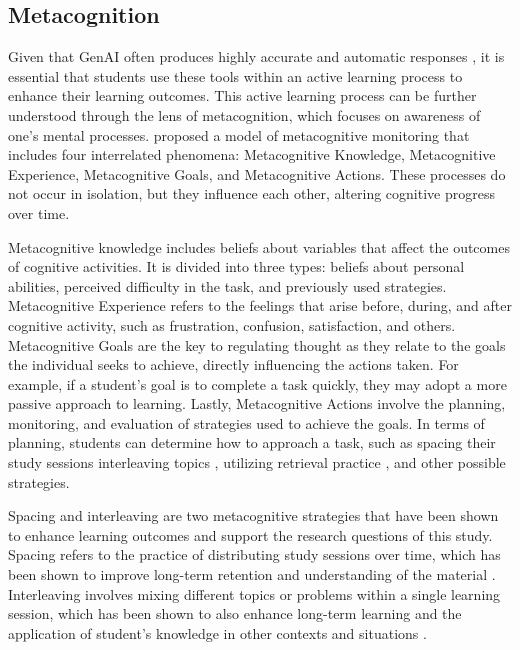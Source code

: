 \documentclass[runningheads]{llncs}
\begin{document}
\subsection{Metacognition}

Given that GenAI often produces highly accurate and automatic responses
\cite{Puryear22}, it is essential that students use these tools within an
active learning process to enhance their learning outcomes. This active
learning process can be further understood through the lens of metacognition,
which focuses on awareness of one's mental processes. \cite{flavell79}
proposed a model of metacognitive monitoring that includes four interrelated
phenomena: Metacognitive Knowledge, Metacognitive Experience, Metacognitive
Goals, and Metacognitive Actions. These processes do not occur in isolation, but
they influence each other, altering cognitive progress over time.

Metacognitive knowledge includes beliefs about variables that affect the
outcomes of cognitive activities. It is divided into three types: beliefs about
personal abilities, perceived difficulty in the task, and previously used
strategies. Metacognitive Experience refers to the feelings that arise before,
during, and after cognitive activity, such as frustration, confusion,
satisfaction, and others. Metacognitive Goals are the key to regulating thought
as they relate to the goals the individual seeks to achieve, directly
influencing the actions taken. For example, if a student’s goal is to complete
a task quickly, they may adopt a more passive approach to learning. Lastly,
Metacognitive Actions involve the planning, monitoring, and evaluation of
strategies used to achieve the goals. In terms of planning, students can
determine how to approach a task, such as spacing their study sessions
\cite{Ouhao18,Carvalho20} interleaving topics \cite{Rivers21}, utilizing
retrieval practice \cite{larsen18}, and other possible strategies.

Spacing and interleaving are two metacognitive strategies that have been shown
to enhance learning outcomes and support the research questions of this study.
Spacing refers to the practice of distributing study sessions over time, which
has been shown to improve long-term retention and understanding of the material
\cite{Carvalho20}. Interleaving involves mixing different topics or problems
within a single learning session, which has been shown to also enhance long-term
learning and the application of student's knowledge in other contexts and
situations \cite{Rivers21}.
\end{document}
